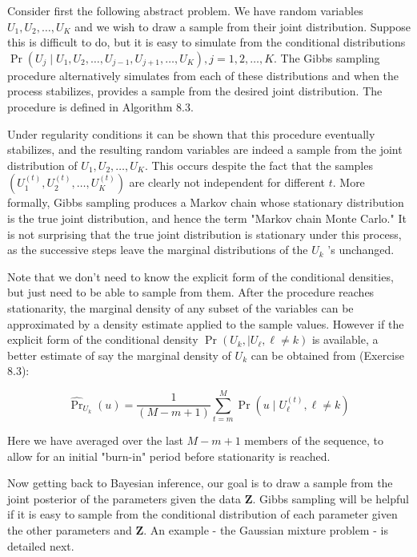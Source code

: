 \documentclass[10pt]{article}
\begin{document}
Consider first the following abstract problem. We have random variables $U_{1}, U_{2}, \ldots, U_{K}$ and we wish to draw a sample from their joint distribution. Suppose this is difficult to do, but it is easy to simulate from the conditional distributions $\operatorname{Pr}\left(U_{j} \mid U_{1}, U_{2}, \ldots, U_{j-1}, U_{j+1}, \ldots, U_{K}\right), j=1,2, \ldots, K$. The Gibbs sampling procedure alternatively simulates from each of these distributions and when the process stabilizes, provides a sample from the desired joint distribution. The procedure is defined in Algorithm 8.3.

Under regularity conditions it can be shown that this procedure eventually stabilizes, and the resulting random variables are indeed a sample from the joint distribution of $U_{1}, U_{2}, \ldots, U_{K}$. This occurs despite the fact that the samples $\left(U_{1}^{(t)}, U_{2}^{(t)}, \ldots, U_{K}^{(t)}\right)$ are clearly not independent for different $t$. More formally, Gibbs sampling produces a Markov chain whose stationary distribution is the true joint distribution, and hence the term "Markov chain Monte Carlo." It is not surprising that the true joint distribution is stationary under this process, as the successive steps leave the marginal distributions of the $U_{k}$ 's unchanged.

Note that we don't need to know the explicit form of the conditional densities, but just need to be able to sample from them. After the procedure reaches stationarity, the marginal density of any subset of the variables can be approximated by a density estimate applied to the sample values. However if the explicit form of the conditional density $\operatorname{Pr}\left(U_{k}, \mid U_{\ell}, \ell \neq k\right)$ is available, a better estimate of say the marginal density of $U_{k}$ can be obtained from (Exercise 8.3):


\begin{equation*}
\widehat{\operatorname{Pr}}_{U_{k}}(u)=\frac{1}{(M-m+1)} \sum_{t=m}^{M} \operatorname{Pr}\left(u \mid U_{\ell}^{(t)}, \ell \neq k\right) \tag{8.50}
\end{equation*}


Here we have averaged over the last $M-m+1$ members of the sequence, to allow for an initial "burn-in" period before stationarity is reached.

Now getting back to Bayesian inference, our goal is to draw a sample from the joint posterior of the parameters given the data $\mathbf{Z}$. Gibbs sampling will be helpful if it is easy to sample from the conditional distribution of each parameter given the other parameters and $\mathbf{Z}$. An example - the Gaussian mixture problem - is detailed next.
\end{document}

